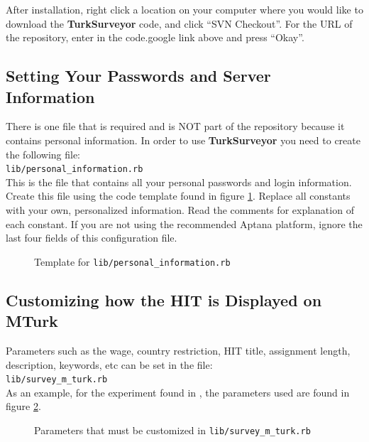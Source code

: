 \documentclass[12pt]{article}
\begin{document}
After installation, right click a location on your computer where you would like to download the \textbf{TurkSurveyor} code, and click ``SVN Checkout''. For the URL of the repository, enter in the code.google link above and press ``Okay''.

\subsection{Setting Your Passwords and Server Information}

There is one file that is required and is NOT part of the repository because it contains personal information. In order to use \textbf{TurkSurveyor} you need to create the following file:\\

\texttt{lib/personal\_information.rb} \\

This is the file that contains all your personal passwords and login information. Create this file using the code template found in figure  \ref{code:personal_information.rb}. Replace all constants with your own, personalized information. Read the comments for explanation of each constant. If you are not using the recommended Aptana platform, ignore the last four fields of this configuration file.

\begin{figure}[htp]
\centering

\caption{Template for \texttt{lib/personal\_information.rb}}
\label{code:personal_information.rb}
\end{figure}

\subsection{Customizing how the HIT is Displayed on MTurk}

Parameters such as the wage, country restriction, HIT title, assignment length, description, keywords, etc can be set in the file:\\

\texttt{lib/survey\_m\_turk.rb} \\

As an example, for the experiment found in \citet{KapelnerChandler2010}, the parameters used are found in figure \ref{code:survey_turk_relevant.rb}.

\begin{figure}[htp]
\centering

\caption{Parameters that must be customized in {\texttt{lib/survey\_m\_turk.rb}}}
\label{code:survey_turk_relevant.rb}
\end{figure}
\end{document}
